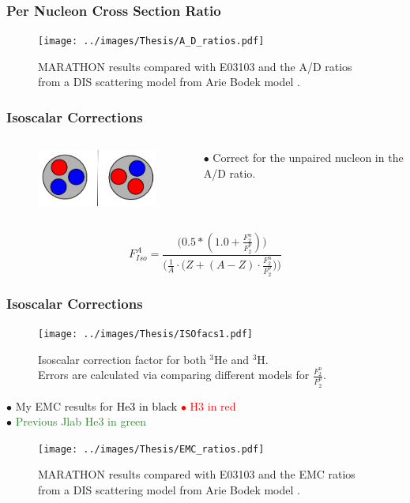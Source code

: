 \documentclass[12pt,usenames,dvipsnames]{beamer}
\begin{document}
\begin{frame}{}
\frametitle{Per Nucleon Cross Section Ratio}
\vspace{-20pt}
\begin{figure}
	\texttt{[image: ../images/Thesis/A\_D\_ratios.pdf]}
	\caption*{MARATHON results compared with E03103 \cite{E3103} and the A/D ratios from a DIS scattering model from Arie Bodek model \cite{bodek}.}
\end{figure}

\end{frame}

\begin{frame}{}
\frametitle{Isoscalar Corrections}
\vspace*{-1cm}
\begin{columns}
	\begin{figure}
		\includegraphics[width =5cm]{../images/mirror}
	\end{figure}
	$\bullet$ Correct for the unpaired nucleon in the A/D ratio.	
\end{columns}
\begin{equation}
F^A_{Iso} = \frac{\Big(0.5*(1.0 + \frac{F_2^n}{F_2^p})\Big)}{ \Big(\frac{1}{A} \cdot \big(Z+(A-Z)\cdot \frac{F_2^n}{F_2^p}\big) \Big) }\nonumber
\end{equation}

\end{frame}

\begin{frame}{}
\frametitle{Isoscalar Corrections}
\vspace*{-0.75cm}

\begin{figure}

	\texttt{[image: ../images/Thesis/ISOfacs1.pdf]}
		\centering
	\caption*{ Isoscalar correction factor for both $^3$He and $^3$H.\\
    	 Errors are calculated via comparing different models for $\frac{F_2^n}{F_2^p}$.}
\end{figure}

\end{frame}
\begin{frame}{}
$\bullet$ My EMC results for \textcolor{black}{He3 in black} \textcolor{red}{$\bullet$ H3 in red}\\
$\bullet$ \textcolor{ForestGreen}{Previous Jlab He3 in green}
\begin{figure}
	\texttt{[image: ../images/Thesis/EMC\_ratios.pdf]}
	\caption*{MARATHON results compared with E03103 \cite{E3103} and the EMC ratios from a DIS scattering model from Arie Bodek model \cite{bodek}.}
\end{figure}
\end{frame}
\end{document}
